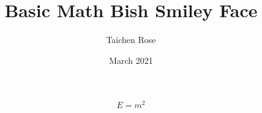                                                                                                                                                                                                                                                                                                                                     \documentclass{article}
\title{Basic Math Bish Smiley Face}
\author{Taichen Rose}
\date{March 2021}
\begin{document}
\begin{equation}
E=m^2
\end{equation}
\end{document}
